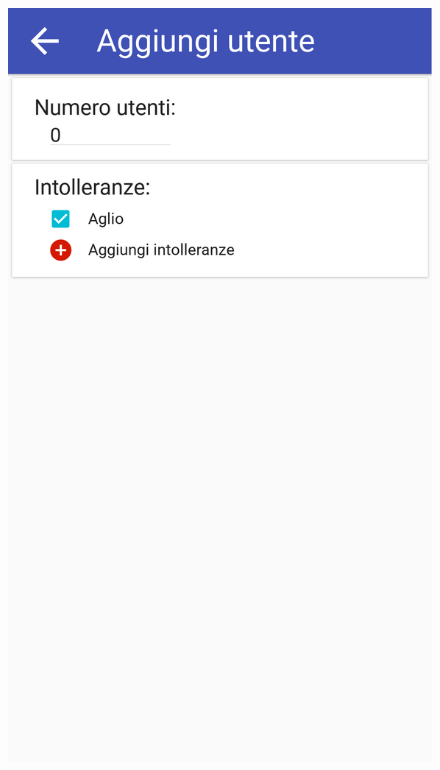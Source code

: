 \begin{figure}[H]
	\begin{minipage}{.49\textwidth}
		\includegraphics[width=\textwidth]{img/wireframe/aggiungi_utente_generico.png}
	\end{minipage}
	\begin{minipage}{.49\textwidth}

\end{minipage}
\end{figure}
